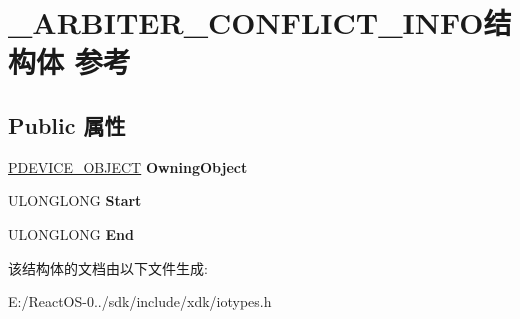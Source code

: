 \hypertarget{struct___a_r_b_i_t_e_r___c_o_n_f_l_i_c_t___i_n_f_o}{}\section{\+\_\+\+A\+R\+B\+I\+T\+E\+R\+\_\+\+C\+O\+N\+F\+L\+I\+C\+T\+\_\+\+I\+N\+F\+O结构体 参考}
\label{struct___a_r_b_i_t_e_r___c_o_n_f_l_i_c_t___i_n_f_o}
\subsection*{Public 属性}
\begin{DoxyCompactItemize}
\item 
\mbox{\label{struct___a_r_b_i_t_e_r___c_o_n_f_l_i_c_t___i_n_f_o_ac2d65708df9b2c35c95df48ddee2e145}} 
\hyperlink{struct___d_e_v_i_c_e___o_b_j_e_c_t}{P\+D\+E\+V\+I\+C\+E\+\_\+\+O\+B\+J\+E\+CT} {\bfseries Owning\+Object}
\item 
\mbox{\label{struct___a_r_b_i_t_e_r___c_o_n_f_l_i_c_t___i_n_f_o_a36fd08c4655cd6073734e8506a92b183}} 
U\+L\+O\+N\+G\+L\+O\+NG {\bfseries Start}
\item 
\mbox{\label{struct___a_r_b_i_t_e_r___c_o_n_f_l_i_c_t___i_n_f_o_a9438997a6c65195ad8ec9ac38584dbb2}} 
U\+L\+O\+N\+G\+L\+O\+NG {\bfseries End}
\end{DoxyCompactItemize}


该结构体的文档由以下文件生成\+:\begin{DoxyCompactItemize}
\item 
E\+:/\+React\+O\+S-\/0../sdk/include/xdk/iotypes.\+h\end{DoxyCompactItemize}

